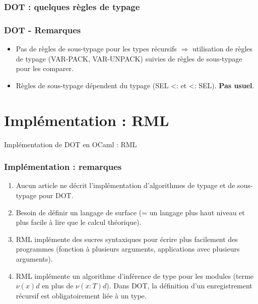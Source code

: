 \documentclass{beamer}
\begin{document}
\begin{frame}
  \frametitle{DOT : quelques règles de typage}
\end{frame}

%

\begin{frame}
  \frametitle{DOT - Remarques}
  \begin{itemize}
  \item Pas de règles de sous-typage pour les types récursifs $\Rightarrow$
    utilisation de règles de typage (VAR-PACK, VAR-UNPACK) suivies de règles de
    sous-typage pour les comparer.
  \item Règles de sous-typage dépendent du typage (SEL <: et <: SEL). \textbf{Pas usuel}.
  \end{itemize}
\end{frame}

\section{Implémentation : RML}

\begin{frame}
	\begin{center}
		\Huge{Implémentation de DOT en OCaml : RML}
	\end{center}
\end{frame}

\begin{frame}
  \frametitle{Implémentation : remarques}
	\begin{center}
    \begin{enumerate}
      \item Aucun article ne décrit l'implémentation d'algorithmes de typage et
        de sous-typage pour DOT.
      \item Besoin de définir un langage de surface (= un langage plus haut
        niveau et plus facile à lire que le calcul théorique).
      \item RML implémente des sucres syntaxiques pour écrire plus
        facilement des programmes (fonction à plusieurs arguments, applications
        avec plusieurs arguments).
      \item RML implémente un algorithme d'inférence de type pour les modules
        (terme $\nu(x)d$ en plus de $\nu(x : T)d$).
        Dans DOT, la définition d'un enregistrement récursif est obligatoirement liée à un type.
      \end{enumerate}
	\end{center}
\end{frame}
\end{document}

